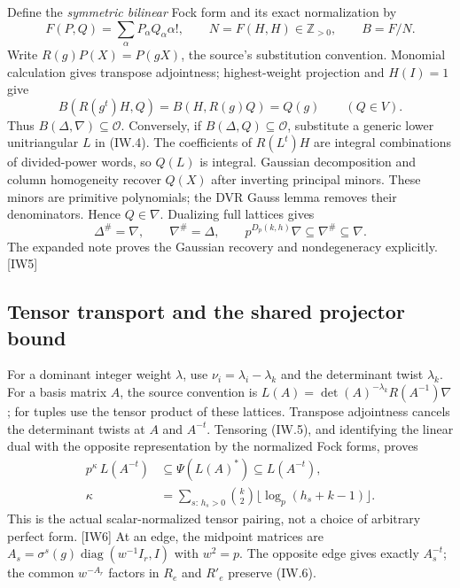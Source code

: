 \documentclass[11pt,a4paper]{article}
\numberwithin{equation}{section}
\theoremstyle{remark}\newtheorem{remark}[theorem]{Remark}
\begin{document}
Define the \emph{symmetric bilinear} Fock form and its exact normalization by
\[
 F(P,Q)=\sum_\alpha P_\alpha Q_\alpha\alpha!,\qquad
 N=F(H,H)\in\mathbb Z_{>0},\qquad B=F/N.
\]
Write $R(g)P(X)=P(gX)$, the source's substitution convention.
Monomial calculation gives transpose adjointness; highest-weight projection and $H(I)=1$ give
\[
 B(R(g^t)H,Q)=B(H,R(g)Q)=Q(g)\qquad(Q\in V). \tag{IW.4}
\]
Thus $B(\Delta,\nabla)\subseteq\mathcal O$.
Conversely, if $B(\Delta,Q)\subseteq\mathcal O$, substitute a generic lower unitriangular $L$ in (IW.4).
The coefficients of $R(L^t)H$ are integral combinations of divided-power words, so $Q(L)$ is integral.
Gaussian decomposition and column homogeneity recover $Q(X)$ after inverting principal minors.
These minors are primitive polynomials; the DVR Gauss lemma removes their denominators.
Hence $Q\in\nabla$. Dualizing full lattices gives
\[
 \Delta^\#=\nabla,\qquad \nabla^\#=\Delta,
 \qquad p^{D_p(k,h)}\nabla\subseteq\nabla^\#\subseteq\nabla. \tag{IW.5}
\]
The expanded note proves the Gaussian recovery and nondegeneracy explicitly. \textsf{[IW5]}

\subsection{Tensor transport and the shared projector bound}

For a dominant integer weight $\lambda$, use $\nu_i=\lambda_i-\lambda_k$ and the determinant twist $\lambda_k$.
For a basis matrix $A$, the source convention is $L(A)=\det(A)^{-\lambda_k}R(A^{-1})\nabla$; for tuples use the tensor product of these lattices.
Transpose adjointness cancels the determinant twists at $A$ and $A^{-t}$.
Tensoring (IW.5), and identifying the linear dual with the opposite representation by the normalized Fock forms, proves
\[
 \begin{aligned}
 p^{\kappa}\,L(A^{-t})&\subseteq\Psi(L(A)^*)\subseteq L(A^{-t}),\\
 \kappa&=\sum_{s:\,h_s>0}\binom{k}{2}\lfloor\log_p(h_s+k-1)\rfloor.
 \end{aligned}
 \tag{IW.6}
\]
This is the actual scalar-normalized tensor pairing, not a choice of arbitrary perfect form. \textsf{[IW6]}
At an edge, the midpoint matrices are $A_s=\sigma^s(g)\operatorname{diag}(w^{-1}I_r,I)$ with $w^2=p$.
The opposite edge gives exactly $A_s^{-t}$; the common $w^{-A_r}$ factors in $R_e$ and $R'_e$ preserve (IW.6).
\end{document}
